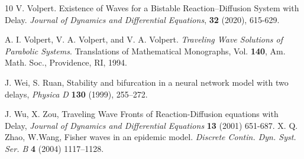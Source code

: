 \documentclass[12pt,letterpaper]{amsart}
\theoremstyle{definition}
\theoremstyle{remark}
\numberwithin{equation}{section}
\begin{document}
\begin{thebibliography}{10}
 V. Volpert.
Existence of Waves for a Bistable Reaction–Diffusion System with Delay. {\it Journal of Dynamics and Differential Equations}, {\bf 32} (2020), 615-629.


A. I. Volpert, V. A. Volpert, and V. A. Volpert. {\it Traveling Wave Solutions of Parabolic
Systems}. Translations of Mathematical Monographs, Vol. {\bf 140}, Am. Math. Soc.,
Providence, RI, 1994.


J. Wei, S. Ruan, Stability and bifurcation in a neural network model with
two delays, \textit{Physica D} \textbf{130} (1999), 255–272.

J. Wu, X. Zou, Traveling Wave Fronts of Reaction-Diffusion equations with Delay,\textit{ Journal of
Dynamics and Differential Equations} \textbf{13} (2001) 651-687.
 X. Q. Zhao,  W.Wang, Fisher waves in an epidemic model. \textit{Discrete Contin.
Dyn. Syst. Ser. B} \textbf{4} (2004) 1117–1128.
\end{thebibliography}
\end{document}
